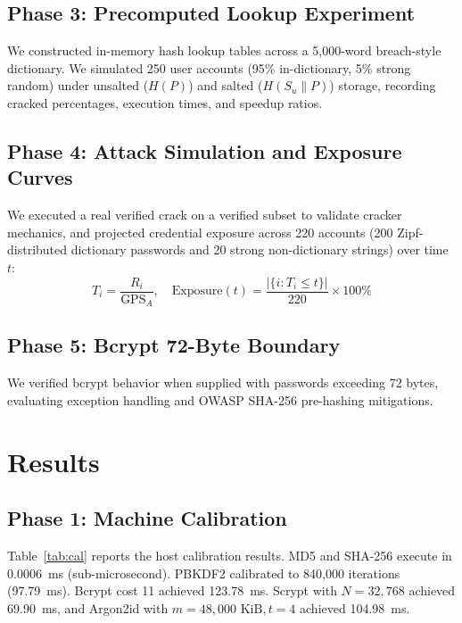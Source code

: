 \documentclass[conference]{IEEEtran}
\begin{document}
\subsection{Phase 3: Precomputed Lookup Experiment}
We constructed in-memory hash lookup tables across a 5,000-word breach-style dictionary. We simulated 250 user accounts (95\% in-dictionary, 5\% strong random) under unsalted ($H(P)$) and salted ($H(S_u \parallel P)$) storage, recording cracked percentages, execution times, and speedup ratios.

\subsection{Phase 4: Attack Simulation and Exposure Curves}
We executed a real verified crack on a verified subset to validate cracker mechanics, and projected credential exposure across 220 accounts (200 Zipf-distributed dictionary passwords and 20 strong non-dictionary strings) over time $t$:
\begin{equation}
T_i = \frac{R_i}{\text{GPS}_A}, \quad \text{Exposure}(t) = \frac{|\{i : T_i \le t\}|}{220} \times 100\%
\end{equation}

\subsection{Phase 5: Bcrypt 72-Byte Boundary}
We verified bcrypt behavior when supplied with passwords exceeding 72 bytes, evaluating exception handling and OWASP SHA-256 pre-hashing mitigations.

\section{Results}

\subsection{Phase 1: Machine Calibration}
Table~\ref{tab:cal} reports the host calibration results. MD5 and SHA-256 execute in 0.0006~ms (sub-microsecond). PBKDF2 calibrated to 840,000 iterations (97.79~ms). Bcrypt cost 11 achieved 123.78~ms. Scrypt with $N=32,768$ achieved 69.90~ms, and Argon2id with $m=48,000\text{ KiB}, t=4$ achieved 104.98~ms.
\end{document}

